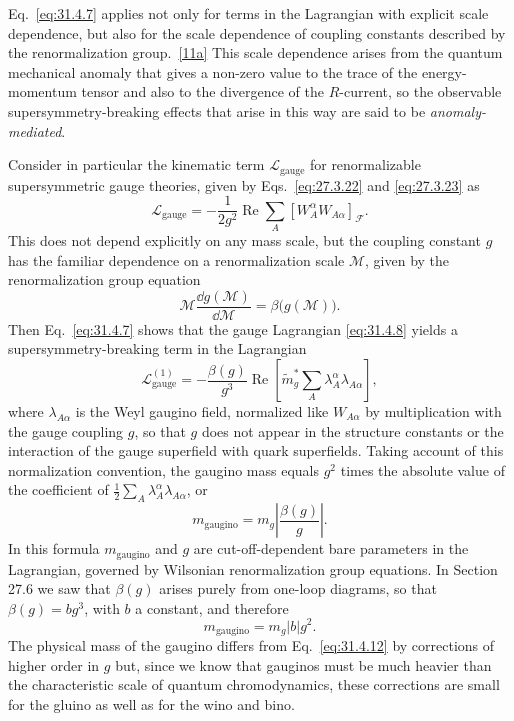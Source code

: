 Eq.~\eqref{eq:31.4.7} applies not only for terms in the Lagrangian with
explicit scale dependence, but also for the scale dependence of coupling
constants described by the renormalization
group.~\hyperref[ch31-ref-11a]{[11a]} This scale dependence arises from the
quantum mechanical anomaly that gives a non-zero value to the trace of the
energy-momentum tensor and also to the divergence of the \(R\)-current, so
the observable supersymmetry-breaking effects that arise in this way are
said to be \emph{anomaly-mediated}.

Consider in particular the kinematic term \(\mathcal L_{\mathrm{gauge}}\)
for renormalizable supersymmetric gauge theories, given by
Eqs.~\eqref{eq:27.3.22} and \eqref{eq:27.3.23} as
\begin{equation}
  \mathcal L_{\mathrm{gauge}}
  =-\frac1{2g^2}\operatorname{Re}
  \sum_A[W_A^\alpha W_{A\alpha}]_{\mathcal F}.
  \tag{31.4.8}\label{eq:31.4.8}
\end{equation}
This does not depend explicitly on any mass scale, but the coupling
constant \(g\) has the familiar dependence on a renormalization scale
\(\mathcal M\), given by the renormalization group equation
\begin{equation}
  \mathcal M\frac{\dd g(\mathcal M)}{\dd\mathcal M}
  =\beta\bigl(g(\mathcal M)\bigr).
  \tag{31.4.9}\label{eq:31.4.9}
\end{equation}
Then Eq.~\eqref{eq:31.4.7} shows that the gauge Lagrangian
\eqref{eq:31.4.8} yields a supersymmetry-breaking term in the Lagrangian
\begin{equation}
  \mathcal L_{\mathrm{gauge}}^{(1)}
  =-\frac{\beta(g)}{g^3}\operatorname{Re}
  \left[
    \widetilde m_g^*
    \sum_A\lambda_A^\alpha\lambda_{A\alpha}
  \right],
  \tag{31.4.10}\label{eq:31.4.10}
\end{equation}
where \(\lambda_{A\alpha}\) is the Weyl gaugino field, normalized like
\(W_{A\alpha}\) by multiplication with the gauge coupling
\(g\), so that \(g\) does not appear in the structure constants or the
interaction of the gauge superfield with quark superfields. Taking account
of this normalization convention, the gaugino mass equals \(g^2\) times
the absolute value of the coefficient of
\(\frac12\sum_A\lambda_A^\alpha\lambda_{A\alpha}\), or
\begin{equation}
  m_{\mathrm{gaugino}}
  =m_g\left|\frac{\beta(g)}{g}\right|.
  \tag{31.4.11}\label{eq:31.4.11}
\end{equation}
In this formula \(m_{\mathrm{gaugino}}\) and \(g\) are cut-off-dependent
bare parameters in the Lagrangian, governed by Wilsonian renormalization
group equations. In Section 27.6 we saw that \(\beta(g)\) arises purely
from one-loop diagrams, so that \(\beta(g)=bg^3\), with \(b\) a constant,
and therefore
\begin{equation}
  m_{\mathrm{gaugino}}=m_g|b|g^2.
  \tag{31.4.12}\label{eq:31.4.12}
\end{equation}
The physical mass of the gaugino differs from Eq.~\eqref{eq:31.4.12} by
corrections of higher order in \(g\) but, since we know that gauginos must
be much heavier than the characteristic scale of quantum chromodynamics,
these corrections are small for the gluino as well as for the wino and
bino.

